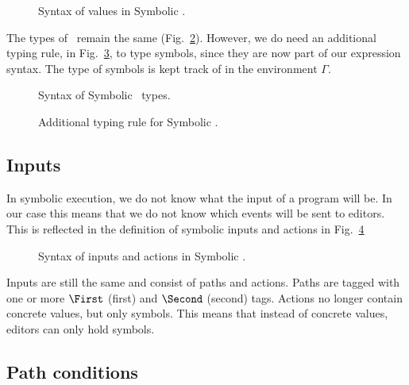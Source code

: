 \begin{figure}[ht]
  \small
  \caption{Syntax of values in Symbolic \TOPHAT.}
  \label{fig:syntaxvalues}
\end{figure}

The types of \STOPHAT\ remain the same (Fig.~\ref{fig:syntaxtypes}).
However, we do need an additional typing rule,  in Fig.~\ref{fig:typingsymbol}, to type symbols,
since they are now part of our expression syntax.
The type of symbols is kept track of in the environment $\Gamma$.

\begin{figure}[t]
  \small
  \caption{Syntax of Symbolic \TOPHAT\ types.}
  \label{fig:syntaxtypes}
\end{figure}

\begin{figure}[t]
  \small
  \caption{Additional typing rule for Symbolic \TOPHAT.}
  \label{fig:typingsymbol}
\end{figure}



\subsection{Inputs}

In symbolic execution, we do not know what the input of a program will be.
In our case this means that we do not know which events will be sent to editors.
This is reflected in the definition of symbolic inputs and actions in Fig.~\ref{fig:syntaxinputs}

\begin{figure}[ht]
  \small
  \caption{Syntax of inputs and actions in Symbolic \TOPHAT.}
  \label{fig:syntaxinputs}
\end{figure}

Inputs are still the same and consist of paths and actions.
Paths are tagged with one or more $\First$ (first) and $\Second$ (second) tags.
Actions no longer contain concrete values, but only symbols.
This means that instead of concrete values, editors can only hold symbols.



\subsection{Path conditions}

